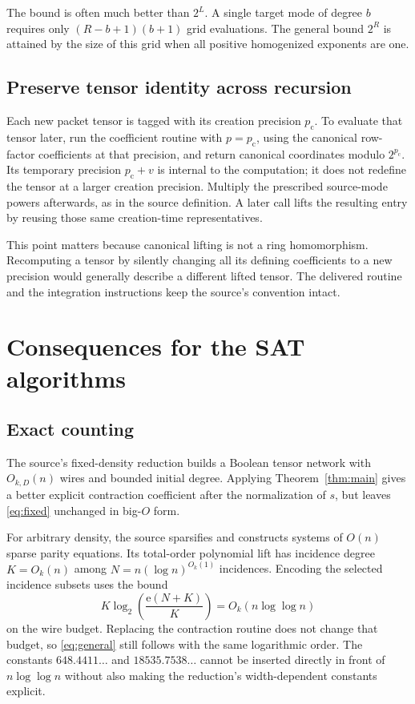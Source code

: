 \documentclass[11pt]{article}
\theoremstyle{remark}
\newcommand{\pc}{p_{\mathrm c}}
\begin{document}
The bound is often much better than $2^L$. A single target mode of degree $b$ requires only $(R-b+1)(b+1)$ grid evaluations. The general bound $2^R$ is attained by the size of this grid when all positive homogenized exponents are one.

\subsection{Preserve tensor identity across recursion}

Each new packet tensor is tagged with its creation precision $\pc$. To evaluate that tensor later, run the coefficient routine with $p=\pc$, using the canonical row-factor coefficients at that precision, and return canonical coordinates modulo $2^{\pc}$. Its temporary precision $\pc+v$ is internal to the computation; it does not redefine the tensor at a larger creation precision. Multiply the prescribed source-mode powers afterwards, as in the source definition. A later call lifts the resulting entry by reusing those same creation-time representatives.

This point matters because canonical lifting is not a ring homomorphism. Recomputing a tensor by silently changing all its defining coefficients to a new precision would generally describe a different lifted tensor. The delivered routine and the integration instructions keep the source's convention intact.

\section{Consequences for the SAT algorithms}
\label{sec:consequences}

\subsection{Exact counting}

The source's fixed-density reduction builds a Boolean tensor network with $O_{k,D}(n)$ wires and bounded initial degree. Applying Theorem~\ref{thm:main} gives a better explicit contraction coefficient after the normalization of $s$, but leaves \eqref{eq:fixed} unchanged in big-$O$ form.

For arbitrary density, the source sparsifies and constructs systems of $O(n)$ sparse parity equations. Its total-order polynomial lift has incidence degree $K=O_k(n)$ among $N=n(\log n)^{O_k(1)}$ incidences. Encoding the selected incidence subsets uses the bound
\[
 K\log_2\!\left(\frac{\mathrm e(N+K)}K\right)
 =O_k(n\log\log n)
\]
on the wire budget. Replacing the contraction routine does not change that budget, so \eqref{eq:general} still follows with the same logarithmic order. The constants $648.4411\ldots$ and $18535.7538\ldots$ cannot be inserted directly in front of $n\log\log n$ without also making the reduction's width-dependent constants explicit.
\end{document}
